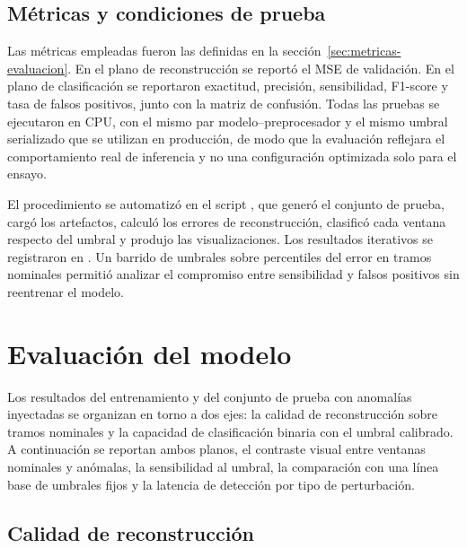 \subsection{Métricas y condiciones de prueba}

Las métricas empleadas fueron las definidas en la sección~\ref{sec:metricas-evaluacion}. En el plano de reconstrucción se reportó el MSE de validación. En el plano de clasificación se reportaron exactitud, precisión, sensibilidad, F1-score y tasa de falsos positivos, junto con la matriz de confusión. Todas las pruebas se ejecutaron en CPU, con el mismo par modelo--preprocesador y el mismo umbral serializado que se utilizan en producción, de modo que la evaluación reflejara el comportamiento real de inferencia y no una configuración optimizada solo para el ensayo.

El procedimiento se automatizó en el script , que generó el conjunto de prueba, cargó los artefactos, calculó los errores de reconstrucción, clasificó cada ventana respecto del umbral y produjo las visualizaciones. Los resultados iterativos se registraron en . Un barrido de umbrales sobre percentiles del error en tramos nominales permitió analizar el compromiso entre sensibilidad y falsos positivos sin reentrenar el modelo.


\section{Evaluación del modelo}
\label{sec:evaluacion-modelo}

Los resultados del entrenamiento y del conjunto de prueba con anomalías inyectadas se organizan en torno a dos ejes: la calidad de reconstrucción sobre tramos nominales y la capacidad de clasificación binaria con el umbral calibrado. A continuación se reportan ambos planos, el contraste visual entre ventanas nominales y anómalas, la sensibilidad al umbral, la comparación con una línea base de umbrales fijos y la latencia de detección por tipo de perturbación.

\subsection{Calidad de reconstrucción}

